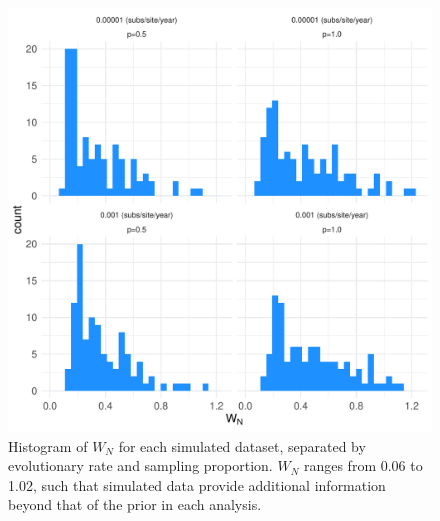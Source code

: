 \documentclass{article}
\begin{document}
{\begin{figure}[H]
\centering
\includegraphics[width=1\linewidth]{../figures/wnHist.pdf}
\caption{Histogram of $W_N$ for each simulated dataset, separated by evolutionary rate and sampling proportion. $W_N$ ranges from 0.06 to 1.02, such that simulated data provide additional information beyond that of the prior in each analysis.}
\label{fig:wnHist}
\end{figure}

}
\end{document}
